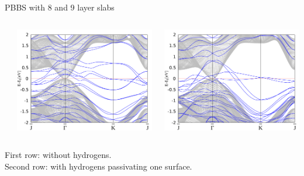 \begin{frame}{PBBS with 8 and 9 layer slabs}
\begin{columns}
\begin{column}{.34\linewidth}
		\end{column}
		\begin{column}{.34\linewidth}
			\centering
			\includegraphics[width=\linewidth]{Te_termination/bulk+9_layers_no_dos_-2_2.pdf}
		\end{column}
		\begin{column}{.34\linewidth}
			\centering
			\includegraphics[width=\linewidth]{Hg_termination/bulk+9_layers_no_dos_-2_2.pdf}
		\end{column}
	\end{columns}
	\vspace{.3cm}
	\footnotesize{
		First row: without hydrogens. \\Second row: with hydrogens passivating one surface.}
\end{frame}

